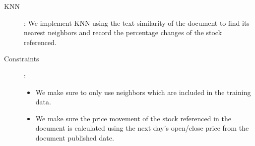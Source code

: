 \documentclass[11pt,letterpaper]{article}
\begin{document}
\begin{description}
	\item[KNN] : We implement KNN using the text similarity of the document to
    find its nearest neighbors and record the percentage changes of the stock referenced.
  \item[Constraints] :
    \begin{itemize}
      \item We make sure to only use neighbors which are included in the training data.
      \item We make sure the price movement of the stock referenced in the document is calculated
            using the next day's open/close price from the document
            published date. ~\cite{stock-matrix}
    \end{itemize}
\end{description}
\end{document}
